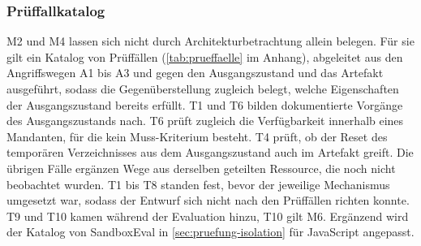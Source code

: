\subsubsection{Prüffallkatalog}

M2 und M4 lassen sich nicht durch Architekturbetrachtung allein belegen. Für sie gilt ein Katalog von Prüffällen
(\autoref{tab:prueffaelle} im Anhang), abgeleitet aus den Angriffswegen A1 bis A3 und gegen den Ausgangszustand und
das Artefakt ausgeführt, sodass die Gegenüberstellung zugleich belegt, welche Eigenschaften der Ausgangszustand bereits
erfüllt. T1 und T6 bilden dokumentierte Vorgänge des Ausgangszustands nach. T6 prüft zugleich die Verfügbarkeit
innerhalb eines Mandanten, für die kein Muss-Kriterium besteht. T4 prüft, ob der Reset des temporären
Verzeichnisses aus dem Ausgangszustand auch im Artefakt greift. Die übrigen Fälle ergänzen Wege aus derselben geteilten Ressource, die noch
nicht beobachtet wurden. T1 bis T8 standen fest, bevor der jeweilige Mechanismus umgesetzt war, sodass der
Entwurf sich nicht nach den Prüffällen richten konnte. T9 und T10 kamen während der Evaluation hinzu, T10 gilt M6. Ergänzend
wird der Katalog von SandboxEval in \autoref{sec:pruefung-isolation} für JavaScript angepasst.

